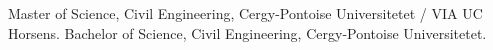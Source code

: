 %
%
%


\begin{scholarship}
					{Master of Science, Civil Engineering, Cergy-Pontoise Universitetet / VIA UC Horsens.}
     				{Bachelor of Science, Civil Engineering, Cergy-Pontoise Universitetet.}
\end{scholarship}